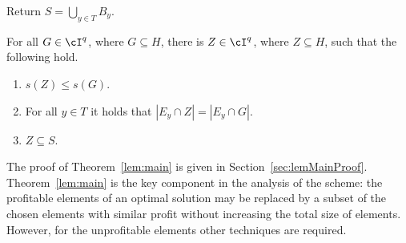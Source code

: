  \begin{algorithm}[h]
	\caption{$\textsf{Chosen}((E,\cI,s,p),q,T)$}
	\label{alg:chosen}
	
	
	Return $S = \bigcup_{y \in T} B_y$. 
\end{algorithm}




 
 
\begin{theorem}
	\label{lem:main}
	For all $G \in \cI^q$, where $G \subseteq H$, there is $Z \in \cI^q$,  where $Z \subseteq H$, such that the following hold. 
	
	\begin{enumerate}
		\item$s(Z) \leq s(G)$.
		
		\item For all $y \in T$ it holds that $|E_y \cap Z| = |E_y \cap G|$.
		
		\item$Z \subseteq S$. 
	\end{enumerate} 
\end{theorem} The proof of Theorem~\ref{lem:main} is given in Section~\ref{sec:lemMainProof}. Theorem~\ref{lem:main} is the key component in the analysis of the scheme: the profitable elements of an optimal solution may be replaced by a subset of the chosen elements with similar profit without increasing the total size of elements. However, for the unprofitable elements other techniques are required. 


